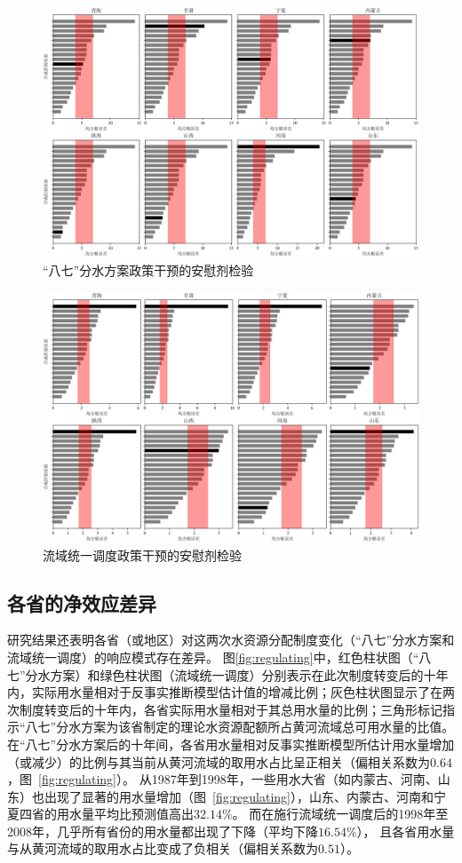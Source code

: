 \begin{figure}
    \includegraphics[width=0.9\linewidth]{img/ch5/ch5_rmse_87.png}
    \centering
    \caption{“八七”分水方案政策干预的安慰剂检验}\label{fig:87placebo}
\end{figure}

\begin{figure}
    \includegraphics[width=0.9\linewidth]{img/ch5/ch5_rmse_98.png}
    \centering
    \caption{流域统一调度政策干预的安慰剂检验}\label{fig:98placebo}
\end{figure}


\subsection{各省的净效应差异}\label{result-3}

研究结果还表明各省（或地区）对这两次水资源分配制度变化（“八七”分水方案和流域统一调度）的响应模式存在差异。
图\ref{fig:regulating}中，红色柱状图（“八七”分水方案）和绿色柱状图（流域统一调度）分别表示在此次制度转变后的十年内，实际用水量相对于反事实推断模型估计值的增减比例；灰色柱状图显示了在两次制度转变后的十年内，各省实际用水量相对于其总用水量的比例；三角形标记指示“八七”分水方案为该省制定的理论水资源配额所占黄河流域总可用水量的比值。
在“八七”分水方案后的十年间，各省用水量相对反事实推断模型所估计用水量增加（或减少）的比例与其当前从黄河流域的取用水占比呈正相关（偏相关系数为$0.64$，图~\ref{fig:regulating}）。
从1987年到1998年，一些用水大省（如内蒙古、河南、山东）也出现了显著的用水量增加（图~\ref{fig:regulating}），山东、内蒙古、河南和宁夏四省的用水量平均比预测值高出$32.14\%$。
而在施行流域统一调度后的1998年至2008年，几乎所有省份的用水量都出现了下降（平均下降$16.54\%$），
且各省用水量与从黄河流域的取用水占比变成了负相关（偏相关系数为$0.51$）。

